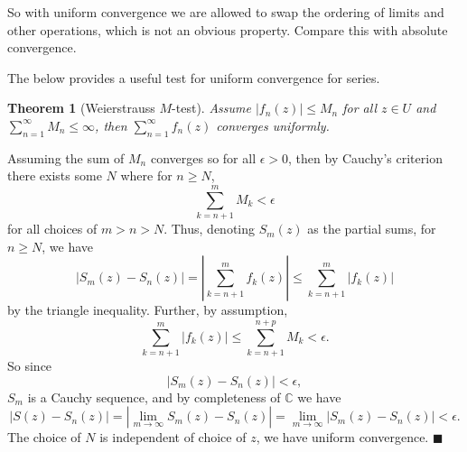 \documentclass[letter-paper]{tufte-book}
\newtheorem{theorem}{\color{pastel-blue}Theorem}[section]
\newenvironment{proof}[1][Proof]{\begin{trivlist}
\item[\hskip \labelsep {\bfseries #1}]}{\end{trivlist}}
\newcommand{\qed}{\hfill$\blacksquare$}
\begin{document}
So with uniform convergence we are allowed to swap the ordering of limits and
other operations, which is not an obvious property. Compare this with absolute
convergence.

The below provides a useful test for uniform convergence for series.

\begin{theorem}[Weierstrauss $M$-test]
  Assume $|f_n(z)| \leq M_n$ for all $z\in U$ and $\sum_{n=1}^\infty M_n \leq
  \infty$, then $\sum_{n=1}^\infty f_n(z)$ converges uniformly.
\end{theorem}

\begin{proof}
  Assuming the sum of $M_n$ converges so for all $\epsilon > 0$, then by
  Cauchy's criterion there exists some $N$ where for $n \geq N$,
  \begin{equation*}
    \sum_{k = n+1}^{m} M_k < \epsilon
  \end{equation*}
  for all choices of $m > n > N$. Thus, denoting $S_m(z)$ as the partial sums,
  for $n\geq N$, we have
  \begin{equation*}
    |S_m(z) - S_n(z)| = \left|\sum_{k=n+1}^{m} f_k(z)\right| \leq \sum_{k=n+1}^{m} \left|f_k(z)\right|
  \end{equation*}
  by the triangle inequality. Further, by assumption,
  \begin{equation*}
    \sum_{k=n+1}^{m} \left|f_k(z)\right|\leq \sum_{k = n+1}^{n+p} M_k < \epsilon.
  \end{equation*}
  So since
  \begin{equation*}
    |S_m(z) - S_n(z)| < \epsilon,
  \end{equation*}
  $S_m$ is a Cauchy sequence, and by completeness of $\mathbb{C}$ we have
  \begin{equation*}
    |S(z) - S_n(z)| = |\lim_{m\to\infty}S_m(z) - S_n(z)| = \lim_{m\to\infty}|S_m(z) - S_n(z)| < \epsilon.
  \end{equation*}
  The choice of $N$ is independent of choice of $z$, we have uniform convergence. \qed
\end{proof}
\end{document}
